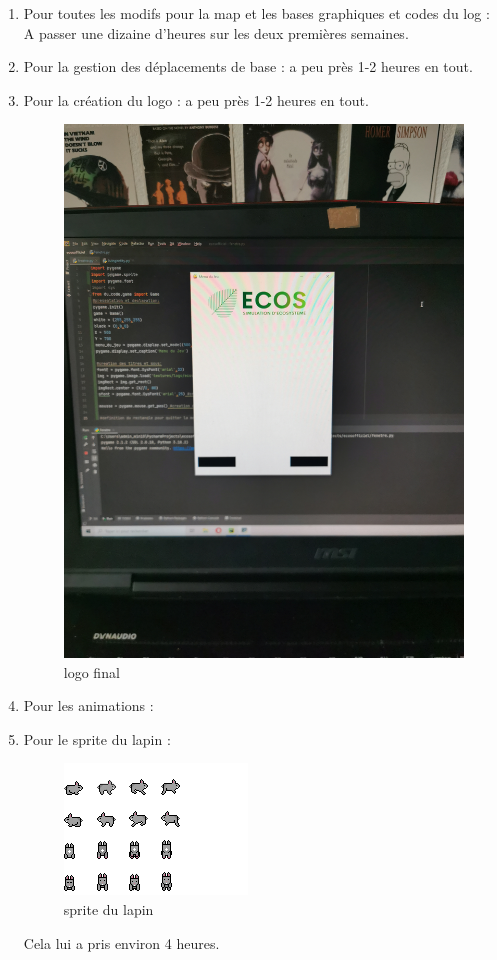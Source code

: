 \documentclass[a4paper, 11pt]{article}
\begin{document}
\begin{enumerate}
\item Pour toutes les modifs pour la map et les bases graphiques et codes du log : A passer une dizaine d'heures sur les deux premières semaines.\\
\item Pour la gestion des déplacements de base : a peu près 1-2 heures en tout.\\
\item Pour la création du logo : a peu près 1-2 heures en tout.\\
\begin{figure}[ht!]
 \centering
 \includegraphics[width=0.5\linewidth]{images/creation_logo.jpg}
 \caption{logo final}
 \label{fig::example::one}
\end{figure}
\item Pour les animations : \\
\item Pour le sprite du lapin :\\
\begin{figure}[ht!]
 \centering
 \includegraphics[width=0.75\linewidth]{images/rabbit.png}
 \caption{sprite du lapin}
 \label{fig::example::one}
\end{figure}
Cela lui a pris environ 4 heures.
\end{enumerate}
\end{document}
